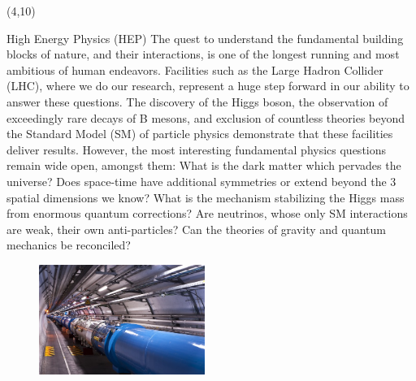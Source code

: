\documentclass[final]{beamer}
\begin{document}
\begin{frame}{}
\begin{textblock}{38.0}(4,10)
\begin{block}{High Energy Physics (HEP)}
The quest to understand the fundamental building blocks of nature,
and their interactions, is one of the longest running and most
ambitious of human endeavors. Facilities such as the Large Hadron
Collider (LHC), where we do our research, represent a huge step
forward in our ability to answer these questions. The discovery of
the Higgs boson, the observation of exceedingly rare decays of B
mesons, and exclusion of countless theories beyond the Standard
Model (SM) of particle physics demonstrate that these facilities
deliver results. However, the most interesting fundamental physics
questions remain wide open, amongst them: What is the dark matter
which pervades the universe? Does space-time have additional
symmetries or extend beyond the 3 spatial dimensions we know? What
is the mechanism stabilizing the Higgs mass from enormous quantum
corrections? Are neutrinos, whose only SM interactions are weak,
their own anti-particles? Can the theories of gravity and quantum
mechanics be reconciled?
~~~ \\
\begin{figure}[tbph]
\centering
\includegraphics[width=0.48\textwidth]{images/0910152_02-A5-at-72-dpi.jpg}

\end{figure}
\end{block}
\end{textblock}
\end{frame}
\end{document}
